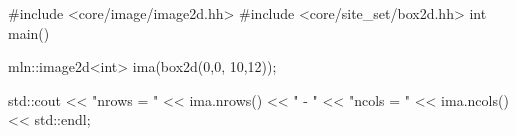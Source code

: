 #include <core/image/image2d.hh>
#include <core/site_set/box2d.hh>
int main()
{
  mln::image2d<int> ima(box2d(0,0, 10,12));

  std::cout << "nrows = " << ima.nrows()
	    << " - "
	    << "ncols = " << ima.ncols()
	    << std::endl;
}
